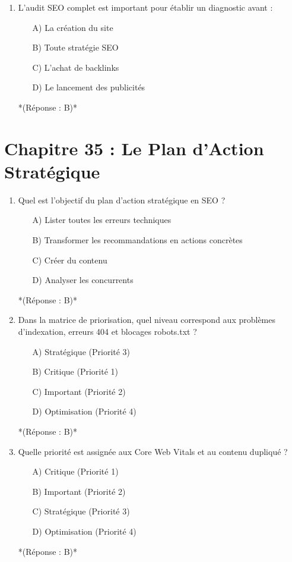 \documentclass[12pt,a4paper,twoside]{report}
\begin{document}
\begin{enumerate}
    \item L'audit SEO complet est important pour établir un diagnostic avant :
    \begin{itemize}
        \item[A)] La création du site
        \item[B)] Toute stratégie SEO
        \item[C)] L'achat de backlinks
        \item[D)] Le lancement des publicités
    \end{itemize}
    *(Réponse : B)*
\end{enumerate}
\section*{Chapitre 35 : Le Plan d'Action Stratégique}
\begin{enumerate}
    \item Quel est l'objectif du plan d'action stratégique en SEO ?
    \begin{itemize}
        \item[A)] Lister toutes les erreurs techniques
        \item[B)] Transformer les recommandations en actions concrètes
        \item[C)] Créer du contenu
        \item[D)] Analyser les concurrents
    \end{itemize}
    *(Réponse : B)*

    \item Dans la matrice de priorisation, quel niveau correspond aux problèmes d'indexation, erreurs 404 et blocages robots.txt ?
    \begin{itemize}
        \item[A)] Stratégique (Priorité 3)
        \item[B)] Critique (Priorité 1)
        \item[C)] Important (Priorité 2)
        \item[D)] Optimisation (Priorité 4)
    \end{itemize}
    *(Réponse : B)*

    \item Quelle priorité est assignée aux Core Web Vitals et au contenu dupliqué ?
    \begin{itemize}
        \item[A)] Critique (Priorité 1)
        \item[B)] Important (Priorité 2)
        \item[C)] Stratégique (Priorité 3)
        \item[D)] Optimisation (Priorité 4)
    \end{itemize}
    *(Réponse : B)*


\end{enumerate}
\end{document}
